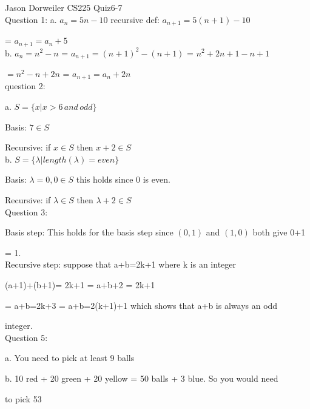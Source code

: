 \documentclass[10pt,a4paper]{report}
\begin{document}
Jason Dorweiler CS225 Quiz6-7\\

Question 1:
a. $a_n = 5n-10$ recursive def: $a_{n+1} = 5(n+1)-10$ 

= $a_{n+1} = a_n+5$ \\

b. $a_n = n^2 -n$  = $a_{n+1} = (n+1)^2-(n+1)$ = $n^2+2n+1-n+1 $

$= n^2-n+2n$ = $a_{n+1} = a_n + 2n$\\

question 2:

a. $S = \{x | x > 6 \,and\, odd\}$

Basis: $7 \in S$

Recursive: if $x \in S$ then $x+2 \in S$\\

b. $S = \{ \lambda | length(\lambda) = even\}$ 

Basis: $\lambda = 0 ,0 \in S$ this holds since 0 is even.

Recursive: if $\lambda \in S$ then $\lambda +2 \in S$\\

Question 3:

Basis step: This holds for the basis step since $(0,1)$ and $(1,0)$ both give 0+1 

= 1.\\

Recursive step: 
suppose that a+b=2k+1 where k is an integer

 (a+1)+(b+1)= 2k+1 = a+b+2 = 2k+1 

= a+b=2k+3 = a+b=2(k+1)+1 which shows that a+b is always an odd 

integer. \\


Question 5:

a. You need to pick at least 9 balls

b. 10 red + 20 green + 20 yellow = 50 balls + 3 blue.  So you would need 

to pick 53
\end{document}
